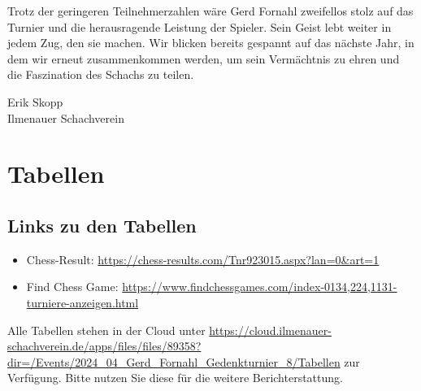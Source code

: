 \documentclass[a4paper,ngerman]{tui-algo-seminar}
\begin{document}
Trotz der geringeren Teilnehmerzahlen wäre Gerd Fornahl zweifellos stolz auf das Turnier und die herausragende Leistung der Spieler. Sein Geist lebt weiter in jedem Zug, den sie machen. Wir blicken bereits gespannt auf das nächste Jahr, in dem wir erneut zusammenkommen werden, um sein Vermächtnis zu ehren und die Faszination des Schachs zu teilen.\vspace{1cm}

Erik Skopp\\
Ilmenauer Schachverein

\clearpage
\section{Tabellen}
\subsection{Links zu den Tabellen}
\begin{itemize}
    \item Chess-Result: \url{https://chess-results.com/Tnr923015.aspx?lan=0&art=1}
    \item Find Chess Game: \url{https://www.findchessgames.com/index-0134,224,1131-turniere-anzeigen.html}
\end{itemize}


Alle Tabellen stehen in der Cloud unter \url{https://cloud.ilmenauer-schachverein.de/apps/files/files/89358?dir=/Events/2024_04_Gerd_Fornahl_Gedenkturnier_8/Tabellen} zur Verfügung. Bitte nutzen Sie diese für die weitere Berichterstattung. 
\end{document}

